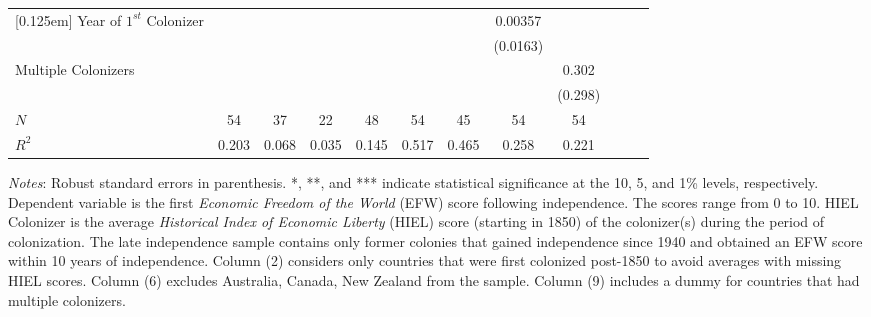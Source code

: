\begin{sidewaystable}[h!]
\begin{threeparttable}
\begin{center}
\begin{minipage}{\textwidth}
\begin{tabular*}{\textwidth}{@{\extracolsep{\fill}}lccccccccccc@{\extracolsep{\fill}}}
[0.125em]
Year of $1^{st}$ Colonizer       &                     &                     &                     &                     &                     &                     &     0.00357         &                     \\
            &                     &                     &                     &                     &                     &                     &    (0.0163)         &                     \\
[0.125em]
Multiple Colonizers        &                     &                     &                     &                     &                     &                     &                     &       0.302         \\
            &                     &                     &                     &                     &                     &                     &                     &     (0.298)         \\
\hline
\(N\)       &          54         &          37         &          22         &          48         &          54         &          45         &          54         &          54         \\
\(R^{2}\)   &       0.203         &       0.068         &       0.035         &       0.145         &       0.517         &       0.465         &       0.258         &       0.221         \\
\hline\hline
\end{tabular*}
\begin{tablenotes}
\small
\item \textit{Notes}: Robust standard errors in parenthesis. *, **, and *** indicate statistical significance at the 10, 5, and 1\% levels, respectively. Dependent variable is the first \textit{Economic Freedom of the World} (EFW) score following independence. The scores range from 0 to 10. HIEL Colonizer is the average \textit{Historical Index of Economic Liberty} (HIEL) score (starting in 1850) of the colonizer(s) during the period of colonization. The late independence sample contains only former colonies that gained independence since 1940 and obtained an EFW score within 10 years of independence. Column (2) considers only countries that were first colonized post-1850 to avoid averages with missing HIEL scores. Column (6) excludes Australia, Canada, New Zealand from the sample. Column (9) includes a dummy for countries that had multiple colonizers.
\end{tablenotes}
\end{minipage}
\end{center}
\end{threeparttable}
\end{sidewaystable}

